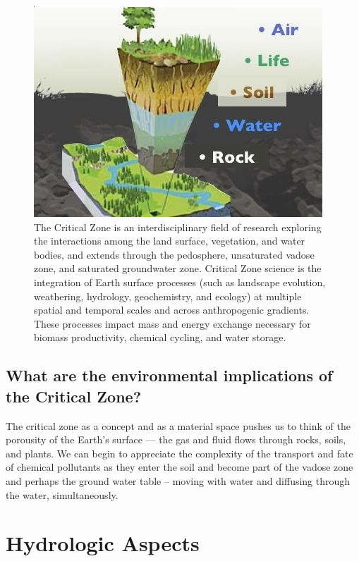\documentclass{book}\usepackage{knitr}
\begin{document}
\begin{figure}
\includegraphics[width=\textwidth]{images/critical-zone/criticalzone.jpg}
\caption{The Critical Zone is an interdisciplinary field of research exploring the interactions among the land surface, vegetation, and water bodies, and extends through the pedosphere, unsaturated vadose zone, and saturated groundwater zone. Critical Zone science is the integration of Earth surface processes (such as landscape evolution, weathering, hydrology, geochemistry, and ecology) at multiple spatial and temporal scales and across anthropogenic gradients. These processes impact mass and energy exchange necessary for biomass productivity, chemical cycling, and water storage.}
\label{fig:criticalzone}
\end{figure}

\subsection{What are the environmental implications of the Critical Zone?}

The critical zone as a concept and as a material space pushes us to think of the porousity of the Earth's surface --- the gas and fluid flows through rocks, soils, and plants. We can begin to appreciate the complexity of the transport and fate of chemical pollutants as they enter the soil and become part of the vadose zone and perhaps the ground water table -- moving with water and diffusing through the water, simultaneously.

\section{Hydrologic Aspects}
\end{document}
